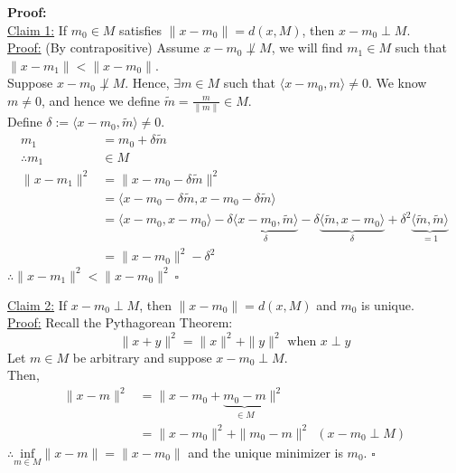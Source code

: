 \documentclass[letterpaper]{article}
\begin{document}
\textbf{Proof:}\\
    \underline{Claim 1:} If $m_0 \in M$ satisfies $\|x-m_0\| = d(x,M)$, then $x-m_0 \perp M$. \\
    \underline{Proof:} (By contrapositive) Assume $x-m_0 \not\perp M$, we will find $m_1 \in M$ such that $\|x-m_1\| < \|x-m_0\|$.\\     Suppose $x-m_0 \not\perp M$. Hence, $\exists m \in M$ such that $ \langle x-m_0, m \rangle  \neq 0$. We know $m \neq 0$, and hence we define $\tilde{m} = \frac{m}{\|m\|} \in M$.\\
        Define $\delta := \langle x-m_0, \tilde{m} \rangle  \neq 0$.
        \begin{align*}
            m_1 &= m_0 + \delta \tilde{m}\\
            \therefore m_1 &\in M\\
            \|x-m_1\|^2 &= \|x-m_0-\delta \tilde{m}\|^2 \\
            &=  \langle x-m_0-\delta \tilde{m}, x-m_0-\delta \tilde{m} \rangle  \\
            &=  \langle x-m_0,x-m_0 \rangle  -\delta \underbrace{\langle x-m_0,\tilde{m} \rangle}_\delta -\delta \underbrace{\langle \tilde{m},x-m_0 \rangle}_\delta  +\delta^2 \underbrace{\langle \tilde{m},\tilde{m} \rangle}_{=1}  \\
            &= \|x-m_0\|^2 -\delta^2
        \end{align*}
    $\therefore \|x-m_1\|^2 < \|x-m_0\|^2\ \square$

\underline{Claim 2:} If $x-m_0 \perp M$, then $\|x-m_0\| = d(x,M)$ and $m_0$ is unique. \\
\underline{Proof:} Recall the Pythagorean Theorem:
    \begin{equation*}
        \|x+y\|^2=\|x\|^2+\|y\|^2 \mbox{ when } x \perp y
    \end{equation*}
    Let $m \in M$ be arbitrary and suppose $x-m_0 \perp M$.\\
    Then,
    \begin{align*}
        \|x-m\|^2 &= \|x-m_0+\underbrace{m_0-m}_{\in M}\|^2 \\
        &= \|x-m_0\|^2 + \|m_0 - m\|^2\ \ \left(x-m_0\perp M\right)
    \end{align*}
    $\therefore \underset{m \in M}{\text{inf}} \|x-m\|=\|x-m_0\|$ and the unique minimizer is $m_0$. $\square$
\end{document}
